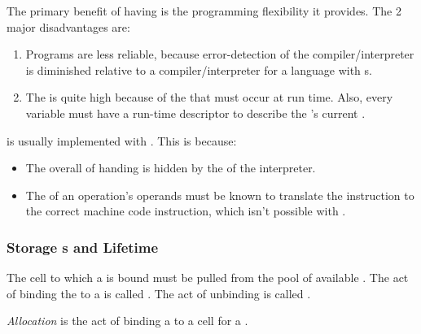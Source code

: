 The primary benefit of having   is the programming flexibility it provides.
The 2 major disadvantages are:
\begin{enumerate}[noitemsep]
\item Programs are less reliable, because error-detection of the compiler/interpreter is diminished relative to a compiler/interpreter for a language with   s.
\item The  is quite high because of the  that must occur at run time. Also, every variable must have a run-time descriptor to describe the 's current .
\end{enumerate}

\begin{remark*}
     is usually implemented with .
  This is because:
  \begin{itemize}[noitemsep]
  \item The overall  of  handing is hidden by the  of the interpreter.
  \item The  of an operation's operands must be known to translate the instruction to the correct machine code instruction, which isn't possible with   .
  \end{itemize}
\end{remark*}

\subsubsection{Storage s and Lifetime}\label{subsubsec:Storage_Bindings_and_Lifetime}
The  cell to which a  is bound must be pulled from the pool of available .
The act of binding the  to a  is called .
The act of unbinding is called .

\begin{definition}[Allocation]\label{def:Variable_Memory_Allocation}
  \emph{Allocation} is the act of binding a  to a  cell for a .
\end{definition}

